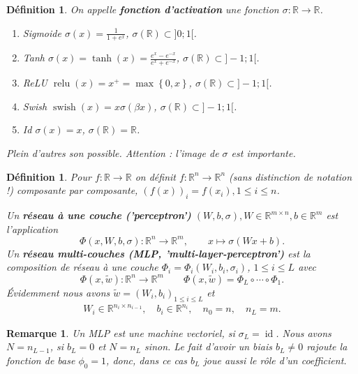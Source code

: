 \documentclass[11pt,a4paper, french]{article}
\newcommand{\R}{\mathbb R}
\newcommand{\Set}[1]{\left\{#1\right\}}
\newcommand{\id}{\operatorname{id}}
\newtheorem{remark}[theorem]{Remarque}
\newtheorem{definition}[theorem]{Définition}
\begin{document}
%
%
\begin{definition}\label{definition:}
On appelle \textbf{fonction d'activation} une fonction $\sigma:\R\to\R$.
\begin{enumerate}
\item Sigmoide $\sigma(x) = \frac{1}{1+e^x}$, \quad $\sigma(\R) \subset ]0;1[$.
\item Tanh $\sigma(x) = \tanh(x) = \frac{e^x-e^{-x}}{e^x+e^{-x}}$, \quad $\sigma(\R) \subset ]-1;1[$.
\item ReLU $\operatorname{relu}(x) = x^+ = \max\Set{0,x}$, \quad $\sigma(\R) \subset ]-1;1[$.
\item Swish $\operatorname{swish}(x) = x\sigma(\beta x)$, \quad $\sigma(\R) \subset ]-1;1[$.
\item Id $\sigma(x) = x$, \quad $\sigma(\R) =\R$.
\end{enumerate}
Plein d'autres son possible. Attention : l'image de $\sigma$ est importante.
\end{definition}
%
%
\begin{definition}\label{definition:}
Pour $f:\R\to \R$ on définit $f:\R^n\to\R^n$ (sans distinction de notation !) composante par composante, $\left(f(x)\right)_i = f(x_i), 1\le i\le n$. 

Un \textbf{réseau à une couche ('perceptron')} $(W,b,\sigma), W\in \R^{m\times n}, b\in \R^m$ est l'application 
%
\begin{equation}\label{equation:}
\Phi(x, W,b,\sigma):\R^n\to\R^m,\qquad x \mapsto \sigma(W x + b).
\end{equation}
%
Un \textbf{réseau multi-couches (MLP, 'multi-layer-perceptron')} est la composition de réseau à une couche $\Phi_i=\Phi_i(W_i,b_i,\sigma_i)$, $1\le i\le L$ avec 
%
\begin{equation}\label{equation:}
\Phi(x, \tilde w):\R^n\to \R^m\qquad \Phi(x, \tilde w) = \Phi_L \circ \cdots \circ \Phi_1.
\end{equation}
%
Évidemment nous avons $\tilde w = (W_i,b_i)_{1\le i\le L}$ et
\begin{align*}
W_i\in \R^{n_i\times n_{i-1}},\quad b_i\in \R^{n_i},\quad n_0=n,\quad n_L = m.
\end{align*}
%
\end{definition}
%
%
\begin{remark}\label{remark:}
Un MLP est une machine vectoriel, si $\sigma_L=\id$. Nous avons $N=n_{L-1}$, si $b_L=0$ et  $N=n_{L}$ sinon.
Le fait d'avoir un biais $b_L\ne0$ rajoute la fonction de base $\phi_0=1$, donc, dans ce cas $b_L$ joue aussi le rôle d'un coefficient.
\end{remark}
\end{document}
